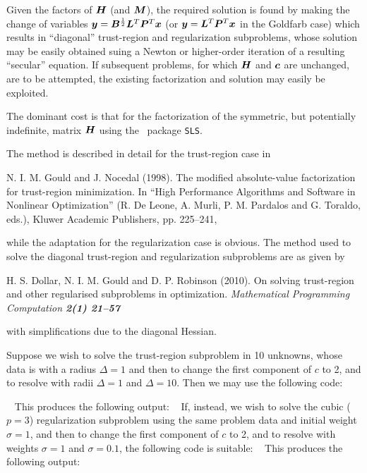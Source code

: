 \documentclass{galahad}
\begin{document}
Given the factors of ${\bm{H}}$ (and ${\bm{M}}$), the required solution is
found by making the change of variables ${\bm{y}} = {\bm{B}}^{{\scriptstyle \frac{1}{2}}} {\bm{L}}^T {\bm{P}}^T {\bm{x}}$
(or ${\bm{y}} = {\bm{L}}^T {\bm{P}}^T {\bm{x}}$ in the Goldfarb case)
which results in ``diagonal'' trust-region and regularization subproblems,
whose solution may be easily obtained suing a Newton or higher-order iteration
of a resulting ``secular'' equation.
If subsequent problems, for which
${\bm{H}}$ and ${\bm{c}}$ are unchanged, are to be attempted, the existing
factorization and solution may easily be exploited.

The dominant cost is that for the factorization of the symmetric, but
potentially indefinite, matrix ${\bm{H}}$ using the \galahad\ package {\tt SLS}.

\galreference

\noindent
The method is described in detail for the trust-region case in
\vspace*{1mm}

\noindent
N. I. M. Gould and J. Nocedal (1998).
The modified absolute-value factorization for trust-region minimization.
In ``High Performance Algorithms and Software in Nonlinear Optimization''
(R. De Leone, A. Murli, P. M. Pardalos and G. Toraldo, eds.),
Kluwer Academic Publishers, pp. 225--241,

\noindent
while the adaptation for the regularization case is obvious. The method used
to solve the diagonal trust-region and regularization subproblems are as
given by

\noindent
H. S. Dollar, N. I. M. Gould and D. P. Robinson (2010).
On solving trust-region and other regularised subproblems in optimization.
\em Mathematical Programming Computation \bf 2(1) \rm 21--57

\noindent
with simplifications due to the diagonal Hessian.


\galexample
Suppose we wish to solve the trust-region subproblem  in 10 unknowns,
whose data is
with a radius $\Delta = 1$
and then to change the first component of
$c$ to 2, and to resolve with radii $\Delta = 1$ and $\Delta = 10$.
Then we may use the following code:

{\tt \small
\VerbatimInput{\packageexample}
}
\noindent
This produces the following output:
{\tt \small
\VerbatimInput{\packageresults}
}
If, instead, we wish to solve the cubic ($p=3$) regularization subproblem
 using the same problem data and initial weight $\sigma = 1$,
and then to change the first component of $c$ to 2, and to resolve
with weights $\sigma = 1$ and $\sigma = 0.1$, the following code
is suitable:
{\tt \small
\VerbatimInput{\packageexampleb}
}
\noindent
This produces the following output:
{\tt \small
\VerbatimInput{\packageresultsb}
}
\end{document}

